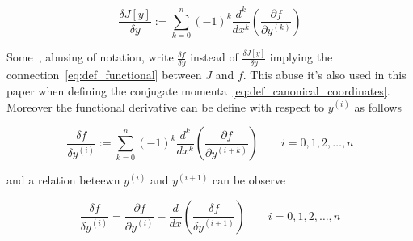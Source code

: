 \begin{equation} \label{eq:functional_derivative}
  \frac{\delta J[y]}{\delta y} := \sum_{k = 0}^{n} {(-1)}^k \frac{d^k}{dx^k}
  \left( \frac{\partial f}{\partial y^{(k)}}\right)
\end{equation}

Some~\cite{Chen13}, abusing of notation,  write $\frac{\delta f}{\delta y}$
instead of $\frac{\delta J[y]}{\delta y}$ implying the
connection~\eqref{eq:def_functional} between $J$ and $f$. This abuse it's
also used in this paper when defining the conjugate
momenta~\eqref{eq:def_canonical_coordinates}. Moreover the functional derivative
can be define with respect to $y^{(i)}$ as follows

\begin{equation} \label{eq:functional_derivative_y_i}
  \frac{\delta f}{\delta y^{(i)}} := \sum_{k = 0}^{n} {(-1)}^k \frac{d^k}{dx^k}
  \left( \frac{\partial f}{\partial y^{(i+k)}}\right)
  \qquad i = 0, 1, 2, \ldots, n
\end{equation}

and a relation beteewn $y^{(i)}$ and $y^{(i+1)}$ can be observe

\begin{equation} \label{eq:functional_derivative_identity}
  \frac{\delta f}{\delta y^{(i)}} =
  \frac{\partial f}{\partial y^{(i)}} -
  \frac{d}{dx}\left(\frac{\delta f}{\delta y^{(i+1)}}\right)
  \qquad i = 0, 1, 2, \ldots, n
\end{equation}
